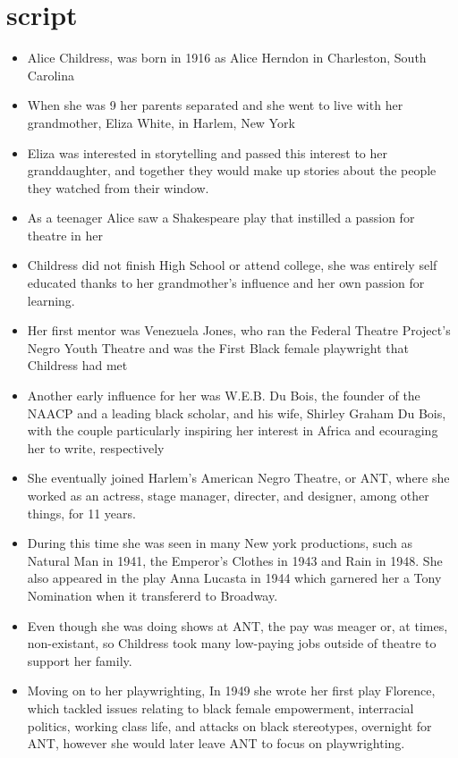 \documentclass[12pt]{article}
\begin{document}
	\section{script}
		\begin{itemize}
			\item Alice Childress, was born in 1916 as Alice Herndon in Charleston, South Carolina
			\item When she was 9 her parents separated and she went to live with her grandmother, Eliza White, in Harlem, New York
			\item Eliza was interested in storytelling and passed this interest to her granddaughter, and together they would make up stories about the people they watched from their window.
			\item As a teenager Alice saw a Shakespeare play that instilled a passion for theatre in her
			\item Childress did not finish High School or attend college, she was entirely self educated thanks to her grandmother's influence and her own passion for learning.
			\item Her first mentor was Venezuela Jones, who ran the Federal Theatre Project's Negro Youth Theatre and was the First Black female playwright that Childress had met
			\item Another early influence for her was W.E.B. Du Bois, the founder of the NAACP and a leading black scholar, and his wife, Shirley Graham Du Bois, with the couple particularly inspiring her interest in Africa and ecouraging her to write, respectively
			\item She eventually joined Harlem's American Negro Theatre, or ANT, where she worked as an actress, stage manager, directer, and designer, among other things, for 11 years. 
			\item During this time she was seen in many New york productions, such as Natural Man in 1941, the Emperor's Clothes in 1943 and Rain in 1948. She also appeared in the play Anna Lucasta in 1944 which garnered her a Tony Nomination when it transfererd to Broadway.
			\item Even though she was doing shows at ANT, the pay was meager or, at times, non-existant, so Childress took many low-paying jobs outside of theatre to support her family.
			\item Moving on to her playwrighting, In 1949 she wrote her first play Florence, which tackled issues relating to black female empowerment, interracial politics, working class life, and attacks on black stereotypes, overnight for ANT, however she would later leave ANT to focus on playwrighting.

\end{itemize}
\end{document}

